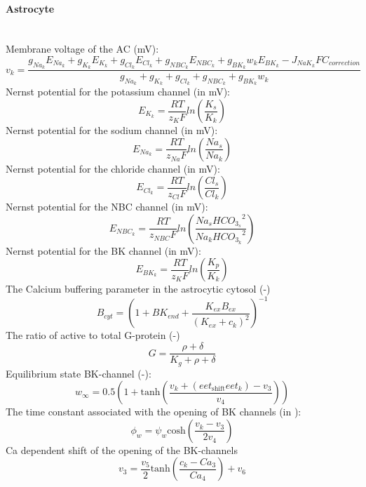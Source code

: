 \paragraph{Astrocyte}~\\
%
Membrane voltage of the \gls{AC} (mV):
\begin{equation} \label{eq:v_k}
v_k=\frac{g_{Na_k}E_{Na_k}+g_{K_k}E_{K_k}+g_{Cl_k}E_{Cl_k}+g_{NBC_k}E_{NBC_k} + g_{BK_k}w_kE_{BK_k} -J_{NaK_k}F C_{correction} }{ g_{Na_k}+g_{K_k}+g_{Cl_k}+g_{NBC_k}+g_{BK_k}w_k }
\end{equation}
%
Nernst potential for the potassium channel (in mV):
\begin{equation} \label{eq:E_K}
E_{K_k}=\frac{RT}{z_K F}ln\left( \frac{K_s}{K_k}\right) 
\end{equation}
%
Nernst potential for the sodium channel (in mV):
\begin{equation} \label{eq:E_Na}
E_{Na_k}=\frac{RT}{z_{Na} F}ln\left( \frac{Na_s}{Na_k}\right) 
\end{equation}
%
Nernst potential for the chloride channel (in mV):
\begin{equation} \label{eq:E_Cl}
E_{Cl_k}=\frac{RT}{z_{Cl} F}ln\left( \frac{Cl_s}{Cl_k}\right) 
\end{equation}
%
Nernst potential for the NBC channel (in mV):
\begin{equation} \label{eq:E_NBC}
E_{NBC_k}=\frac{RT}{z_{NBC} F}ln\left( \frac{Na_s {HCO_{3_s}}^2}{Na_k {HCO_{3_k}}^2}\right) 
\end{equation}
Nernst potential for the BK channel (in mV):
\begin{equation} \label{eq:E_BK}
E_{BK_k}=\frac{RT}{z_K F}ln\left( \frac{K_p}{K_k}\right) 
\end{equation}
The Calcium buffering parameter in the astrocytic cytosol (-)
 \begin{equation} \label{eq:B_cyt}
 	B_{cyt}=\left(1+BK_{end}+ \frac{K_{ex}B_{ex}}{(K_{ex}+c_k)^2}\right)^{-1} 
 \end{equation}
The ratio of active to total G-protein (-)
\begin{equation} \label{eq:G}
   G=\frac{\rho+\delta}{K_g+\rho+\delta}
\end{equation}
Equilibrium state BK-channel (-):
\begin{equation} \label{eq:winf}
w_{\infty}=0.5 \left(1+\mathrm{tanh}\left(\frac{v_{k}+(eet_{\mathrm{shift}}eet_k)-v_{3} }{v_{4}} \right)  \right) 
\end{equation}
%
The time constant associated with the opening of BK channels	 (in \pers):
\begin{equation} \label{eq:phin}
\phi_{w}=\psi_{w}\mathrm{cosh}\left( \frac{v_{k}-v_{3}}{2v_{4}}\right) 
\end{equation}
\gls{Ca} dependent shift of the opening of the BK-channels
\begin{equation} \label{eq:v_3}
v_{3}=\frac{v_5}{2}\mathrm{tanh}\left( \frac{c_k-Ca_3}{Ca_4}\right)+v_6 
\end{equation}

